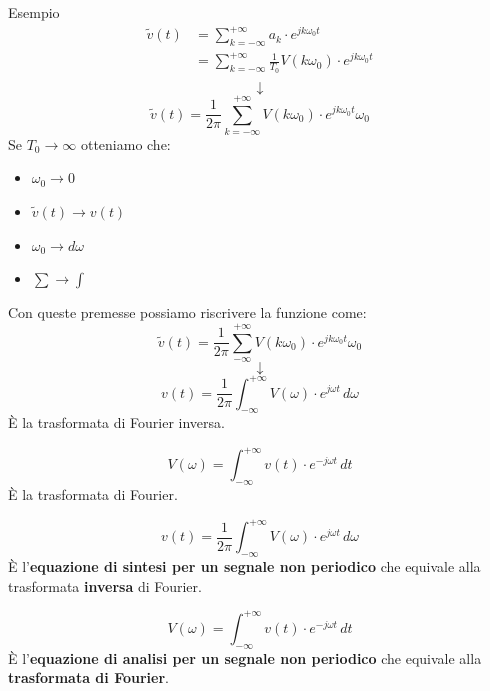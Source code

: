 \documentclass[a4paper]{article}
\begin{document}
\begin{examplebox}{Esempio}
  \vspace{1em}
  \noindent
  \[
    \begin{aligned}
      \tilde{v}(t) &= \sum_{k=-\infty}^{+\infty} a_k \cdot e^{j k \omega_0 t}\\
                   &= \sum_{k=-\infty}^{+\infty} \frac{1}{T_0} V(k \omega_0) \cdot e^{j k \omega_0 t}\\
    \end{aligned}
  \] 
  \[
  \downarrow
  \] 
  \[
    \tilde{v}(t) = \frac{1}{2 \pi } \sum_{k=-\infty}^{+\infty} V(k \omega_0) \cdot e^{j k \omega_0 t} \omega_0
  \] 
  Se \( T_0 \to \infty \) otteniamo che:
  \begin{itemize}
    \item \( \omega_0 \to 0 \) 
    \item \( \tilde{v}(t) \to v(t) \) 
    \item \( \omega_0 \to d \omega \) 
    \item \( \sum \to \int \) 
  \end{itemize}
  Con queste premesse possiamo riscrivere la funzione come:
  \[
    \tilde{v}(t) = \frac{1}{2 \pi } \sum_{-\infty}^{+\infty} V(k \omega_0) \cdot e^{j k \omega_0 t} \omega_0
  \] 
  \[
  \downarrow
  \] 
  \[
    v(t) = \frac{1}{2 \pi } \int_{-\infty}^{+\infty} V(\omega) \cdot e^{j \omega t} \, d\omega
  \] 
  È la trasformata di Fourier inversa.

  \vspace{1em}
  \noindent
  \[
    V(\omega) = \int_{-\infty}^{+\infty} v(t) \cdot e^{-j \omega t} \, dt
  \] 
  È la trasformata di Fourier.
\end{examplebox}

\begin{definition}
  \[
    v(t) = \frac{1}{2 \pi } \int_{-\infty}^{+\infty} V(\omega) \cdot e^{j \omega t} \, d\omega
  \] 
  È l'\textbf{equazione di sintesi per un segnale non periodico} che equivale alla
  trasformata \textbf{inversa} di Fourier.

  \vspace{1em}
  \noindent
  \[
    V(\omega) = \int_{-\infty}^{+\infty} v(t) \cdot e^{-j \omega t} \, dt
  \] 
  È l'\textbf{equazione di analisi per un segnale non periodico} che equivale alla
  \textbf{trasformata di Fourier}.
\end{definition}
\end{document}
